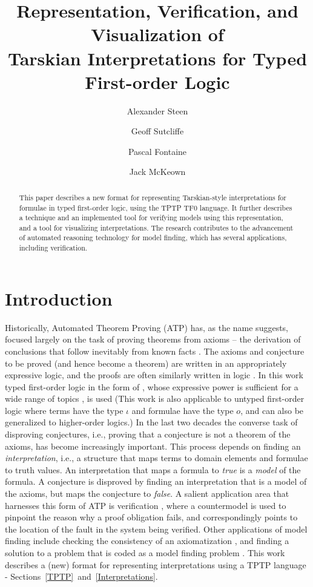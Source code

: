 \documentclass{easychair}
\title{Representation, Verification, and Visualization of\\
Tarskian Interpretations for Typed First-order Logic}
\author{
  Alexander Steen\inst{1}
\and
  Geoff Sutcliffe\inst{2}
\and
  Pascal Fontaine\inst{3}
\and
  Jack McKeown\inst{2} 
}
\institute{
  University of Greifswald,
  Greifswald, Germany\\
  \email{alexander.steen@uni-greifswald.de}
\and
  University of Miami,
  Miami, USA\\
  \email{geoff@cs.miami.edu,jam771@miami.edu}\\
\and
  University of Li{\`e}ge,
  Li{\`e}ge, Belgium\\
  \email{Pascal.Fontaine@uliege.be}\\
}
\begin{document}
\maketitle

\begin{abstract}
This paper describes a new format for representing Tarskian-style interpretations for formulae in 
typed first-order logic, using the TPTP TF0 language.
It further describes a technique and an implemented tool for verifying models using this
representation, and a tool for visualizing interpretations.
The research contributes to the advancement of automated reasoning technology for model finding, 
which has several applications, including verification.
\end{abstract}
\section{Introduction}
\label{Introduction}

Historically, Automated Theorem Proving (ATP) has, as the name suggests, focused largely on the
task of proving theorems from axioms -- the derivation of conclusions that follow inevitably 
from known facts \cite{RV01-HAR}.
The axioms and conjecture to be proved (and hence become a theorem) are written in an 
appropriately expressive logic, and the proofs are often similarly written in logic \cite{SS+06}.
In this work typed first-order logic in the form of \cite{Wal83,Sch85,Coh87},
whose expressive power is sufficient for a wide range of topics \cite{Sut17}, is used
(This work is also applicable to untyped first-order logic
where terms have the type $\iota$ and formulae have the type $o$, 
and can also be generalized to higher-order logics.)
In the last two decades the converse task of disproving conjectures, i.e., proving that a 
conjecture is not a theorem of the axioms, has become increasingly important.
This process depends on finding an {\em interpretation}, i.e., a structure that maps terms 
to domain elements and formulae to truth values.
An interpretation that maps a formula to {\em true} is a {\em model} of the formula.
A conjecture is disproved by finding an interpretation that is a model of the axioms, but 
maps the conjecture to {\em false}.
A salient application area that harnesses this form of ATP is verification \cite{DKW08},
where a countermodel is used to pinpoint the reason why a proof obligation fails, and
correspondingly points to the location of the fault in the system being verified.
Other applications of model finding include checking the consistency of an axiomatization 
\cite{SS+17}, and finding a solution to a problem that is coded as a model finding problem 
\cite{Win82}.
This work describes a (new) format for representing interpretations using a TPTP language -
Sections~\ref{TPTP}~and~\ref{Interpretations}.
\end{document}
